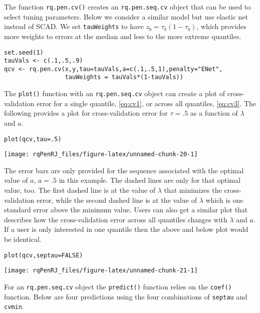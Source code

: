 The function \texttt{rq.pen.cv()} creates an \texttt{rq.pen.seq.cv} object that can be used to select tuning parameters. Below we consider a similar model but use elastic net instead of SCAD. We set \texttt{tauWeights} to have \(z_b=\tau_b(1-\tau_b)\), which provides more weights to errors at the median and less to the more extreme quantiles.

\begin{verbatim}
set.seed(1)
tauVals <- c(.1,.5,.9)
qcv <- rq.pen.cv(x,y,tau=tauVals,a=c(.1,.5,1),penalty="ENet",
                 tauWeights = tauVals*(1-tauVals))
\end{verbatim}

The \texttt{plot()} function with an \texttt{rq.pen.seq.cv} object can create a plot of cross-validation error for a single quantile, \eqref{eq:cv1}, or across all quantiles, \eqref{eq:cv3}. The following provides a plot for cross-validation error for \(\tau=.5\) as a function of \(\lambda\) and \(a\).

\begin{verbatim}
plot(qcv,tau=.5)
\end{verbatim}

\begin{center}\texttt{[image: rqPenRJ\_files/figure-latex/unnamed-chunk-20-1]} \end{center}

The error bars are only provided for the sequence associated with the optimal value of \(a\), \(a=.5\) in this example. The dashed lines are only for that optimal value, too. The first dashed line is at the value of \(\lambda\) that minimizes the cross-validation error, while the second dashed line is at the value of \(\lambda\) which is one standard error above the minimum value. Users can also get a similar plot that describes how the cross-validation error across all quantiles changes with \(\lambda\) and \(a\). If a user is only interested in one quantile then the above and below plot would be identical.

\begin{verbatim}
plot(qcv,septau=FALSE)
\end{verbatim}

\begin{center}\texttt{[image: rqPenRJ\_files/figure-latex/unnamed-chunk-21-1]} \end{center}

For an \texttt{rq.pen.seq.cv} object the \texttt{predict()} function relies on the \texttt{coef()} function. Below are four predictions using the four combinations of \texttt{septau} and \texttt{cvmin}.

